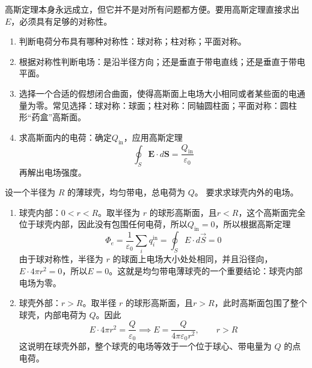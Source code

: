 \documentclass[lang=cn,11pt]{elegantbook}
\begin{document}
\begin{conclusion}[用高斯定理求电场强度]
高斯定理本身永远成立，但它并不是对所有问题都方便。要用高斯定理直接求出 \(E\)，必须具有足够的对称性。
\begin{enumerate}
  \item 判断电荷分布具有哪种对称性：球对称；柱对称；平面对称。
  \item 根据对称性判断电场：是沿半径方向；还是垂直于带电直线；还是垂直于带电平面。
  \item 选择一个合适的假想闭合曲面，使得高斯面上电场大小相同或者某些面的电通量为零。常见选择：球对称：球面；柱对称：同轴圆柱面；平面对称：圆柱形“药盒”高斯面。
  \item 求高斯面内的电荷：确定\(Q_{\mathrm{in}}\)，应用高斯定理\[\oint_S\mathbf E\cdot d\mathbf S
=\frac{Q_{\mathrm{in}}}{\varepsilon_0}\]再解出电场强度。
\end{enumerate}
\end{conclusion}

\begin{exercise}
设一个半径为 \(R\) 的薄球壳，均匀带电，总电荷为 \(Q\)。
要求求球壳内外的电场。
\end{exercise}
\begin{solution}
\begin{enumerate}
  \item 球壳内部：\(0<r<R\)。取半径为 \(r\) 的球形高斯面，且\(r<R\)，这个高斯面完全位于球壳内部，因此没有包围任何电荷，所以\(Q_{\mathrm{in}}=0\)，所以根据高斯定理\[\Phi_e=\frac1{\varepsilon_0}\sum_iq_i^{\mathrm{in}}=\oint_{S}E\cdot d\vec{S}=0\]由于球对称性，半径为 \(r\) 的球面上电场大小处处相同，并且沿径向，\(E\cdot4\pi r^2=0\)，所以\(E=0\)。这就是均匀带电薄球壳的一个重要结论：球壳内部电场为零。
  \item 球壳外部：\(r>R\)。取半径 \(r\) 的球形高斯面，且\(r>R\)，此时高斯面包围了整个球壳，内部电荷为 \(Q\)。因此\[E\cdot4\pi r^2=\frac Q{\varepsilon_0}\implies \boxed{E=\frac{Q}{4\pi\varepsilon_0r^2},\qquad r>R}\]这说明在球壳外部，整个球壳的电场等效于一个位于球心、带电量为 \(Q\) 的点电荷。
\end{enumerate}
\end{solution}
\end{document}
